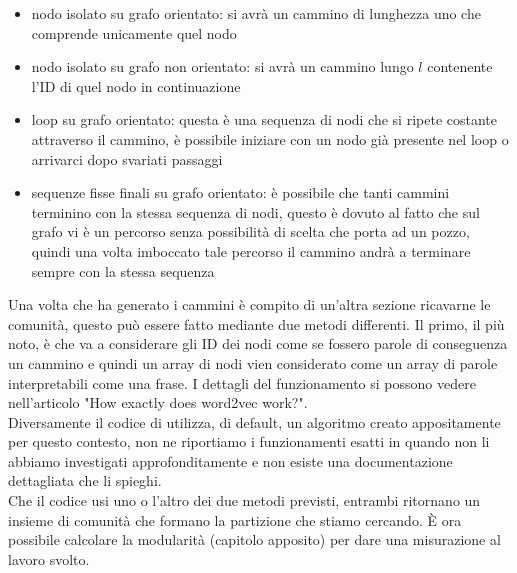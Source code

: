 \begin{itemize}
	\item nodo isolato su grafo orientato: si avrà un cammino di lunghezza uno che comprende unicamente quel nodo
	\item nodo isolato su grafo non orientato: si avrà un cammino lungo $l$ contenente l'ID di quel nodo in continuazione
	\item loop su grafo orientato: questa è una sequenza di nodi che si ripete costante attraverso il cammino, è possibile iniziare con un nodo già presente nel loop o arrivarci dopo svariati passaggi
	\item sequenze fisse finali su grafo orientato: è possibile che tanti cammini terminino con la stessa sequenza di nodi, questo è dovuto al fatto che sul grafo vi è un percorso senza possibilità di scelta che porta ad un pozzo, quindi una volta imboccato tale percorso il cammino andrà a terminare sempre con la stessa sequenza
\end{itemize}
%
Una volta che \nv ha generato i cammini è compito di un'altra sezione ricavarne le comunità, questo può essere fatto mediante due metodi differenti. Il primo, il più noto, è \wv che va a considerare gli ID dei nodi come se fossero parole di conseguenza un cammino e quindi un array di nodi vien considerato come un array di parole interpretabili come una frase. I dettagli del funzionamento si possono vedere nell'articolo "How exactly does word2vec work?".\\
Diversamente il codice di \cnrl utilizza, di default, un algoritmo creato appositamente per questo contesto, non ne riportiamo i funzionamenti esatti in quando non li abbiamo investigati approfonditamente e non esiste una documentazione dettagliata che li spieghi.\\
Che il codice usi uno o l'altro dei due metodi previsti, entrambi ritornano un insieme di comunità che formano la partizione che stiamo cercando. È ora possibile calcolare la modularità (capitolo apposito) per dare una misurazione al lavoro svolto.
%
